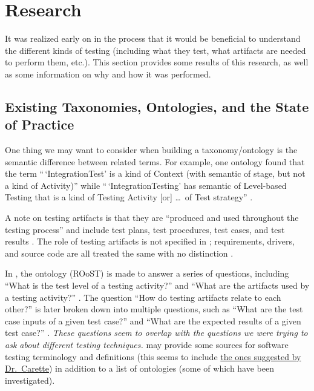 \chapter{Research}
\label{chap:testing}

It was realized early on in the process that it would be beneficial to
understand the different kinds of testing (including what they test, what
artifacts are needed to perform them, etc.). This section provides some results
of this research, as well as some information on why and how it was performed.

\section{Existing Taxonomies, Ontologies, and the State of Practice}

One thing we may want to consider when building a taxonomy/ontology is the
semantic difference between related terms. For example, one ontology found
that the term ``\,`IntegrationTest' is a kind of Context (with
semantic of stage, but not a kind of Activity)'' while ``\,`IntegrationTesting'
has semantic of Level-based Testing that is a kind of Testing Activity [or]
\dots\ of Test strategy'' \citep[p.~157]{TebesEtAl2019}.

A note on testing artifacts is that they are ``produced and used throughout
the testing process'' and include test plans, test procedures, test cases, and
test results \citep[p.~3]{SouzaEtAl2017}. The role of testing
artifacts is not specified in \citep{BarbosaEtAl2006};
requirements, drivers, and source code are all treated the same
with no distinction \citep[p.~3]{BarbosaEtAl2006}.

In \citep{SouzaEtAl2017}, the ontology (ROoST)  is made to
answer a series of questions, including ``What is the test level of a testing
activity?'' and ``What are the artifacts used by a testing activity?''
\citep[pp.~8-9]{SouzaEtAl2017}.
The question ``How do testing artifacts relate to each other?''
\citep[p.~8]{SouzaEtAl2017} is later broken down into multiple questions,
such as ``What are the test case inputs of a given test case?'' and ``What are
the expected results of a given test case?'' \citep[p.~21]{SouzaEtAl2017}.
\emph{These questions seem to overlap with the questions we were trying to ask
    about different testing techniques.} \citet[pp.~152-153]{TebesEtAl2019} may
provide some sources for software testing terminology and definitions
(this seems to include
\href{https://github.com/samm82/TestGen-Thesis/issues/14#issuecomment-1839922715}
{the ones suggested by Dr.~Carette}) in addition to a list of ontologies
(some of which have been investigated).

